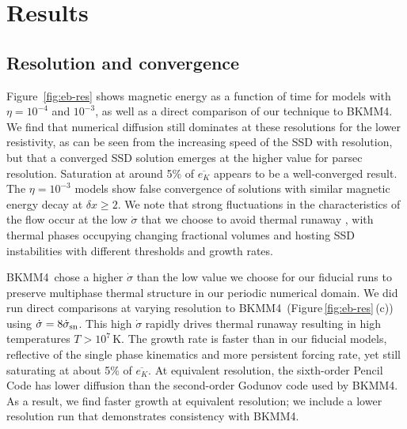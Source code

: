 \documentclass[preprint2]{aastex63}
\newcommand\SNr{\dot\sigma_{\rm sn}}
\newcommand\dx{ {\delta x}}
\newcommand\BKM{{\sf BKMM4}}
\begin{document}

\section{Results} \label{sec:results}

\subsection{{Resolution and convergence}} \label{sec:conv}
 {Figure~\ref{fig:eb-res} shows magnetic energy as a function of time for
 models with $\eta = 10^{-4}$ and $10^{-3}$, as well as a direct comparison of
 our technique to \BKM. We find that numerical diffusion still dominates at
 these resolutions for the lower resistivity, as can be seen from the
 increasing speed of the SSD with resolution, but that a converged SSD solution
 emerges at the higher value for parsec resolution.}
 Saturation at around 5\% of $\overline{e_K}$ appears to be a well-converged
 result.
 {The $\eta = 10^{-3}$ models show} false convergence
 \citep{FMA91} of solutions with similar magnetic energy decay at $\dx\geq2$.
 {We note that strong fluctuations in the characteristics of the flow
 {occur at the} low $\dot\sigma$ {that we choose to avoid thermal runaway
 \citep{LOCBN15},} with thermal phases occupying changing fractional volumes
 \citep[e.g.][]{gatto2015} and hosting SSD instabilities with different 
 thresholds and growth rates.
 }

 {\BKM\ chose a higher $\dot\sigma$ than the low value we choose for our
 fiducial runs} {to preserve multiphase {thermal} structure in {our}
 {periodic} numerical domain.
 {We did run direct comparisons at varying resolution to \BKM\
 (Figure\,\ref{fig:eb-res}\,(c))} using $\dot\sigma=8\SNr$.
 {This high $\dot\sigma$ rapidly drives thermal runaway resulting in high
 temperatures $T>10^7$\,K.}
 The growth rate is faster {than in our fiducial models}, reflective of the
 single phase kinematics and more persistent forcing rate, yet {still}
 saturating at about 5\% of $\overline{e_K}$.
 {At equivalent resolution, the sixth-order Pencil Code has lower diffusion
 than the second-order Godunov code used by \BKM. As a result, we find faster
 growth at equivalent resolution; we} include a lower resolution run {that}
 demonstrate{s} consistency with \BKM.} 
\end{document}
